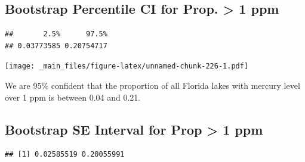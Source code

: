 \documentclass[]{book}
\newenvironment{Shaded}{\begin{snugshade}}{\end{snugshade}}
\newcommand{\KeywordTok}[1]{\textcolor[rgb]{0.13,0.29,0.53}{\textbf{#1}}}
\newcommand{\DecValTok}[1]{\textcolor[rgb]{0.00,0.00,0.81}{#1}}
\newcommand{\FloatTok}[1]{\textcolor[rgb]{0.00,0.00,0.81}{#1}}
\newcommand{\StringTok}[1]{\textcolor[rgb]{0.31,0.60,0.02}{#1}}
\newcommand{\OperatorTok}[1]{\textcolor[rgb]{0.81,0.36,0.00}{\textbf{#1}}}
\newcommand{\NormalTok}[1]{#1}
\begin{document}
\subsection{Bootstrap Percentile CI for Prop. \textgreater{} 1
ppm}\label{bootstrap-percentile-ci-for-prop.-1-ppm}

\begin{Shaded}
\end{Shaded}

\begin{verbatim}
##       2.5%      97.5% 
## 0.03773585 0.20754717
\end{verbatim}

\texttt{[image: \_main\_files/figure-latex/unnamed-chunk-226-1.pdf]}

We are 95\% confident that the proportion of all Florida lakes with
mercury level over 1 ppm is between 0.04 and 0.21.

\subsection{Bootstrap SE Interval for Prop \textgreater{} 1
ppm}\label{bootstrap-se-interval-for-prop-1-ppm}

\begin{Shaded}
\end{Shaded}

\begin{verbatim}
## [1] 0.02585519 0.20055991
\end{verbatim}
\end{document}
